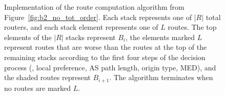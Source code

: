 



\begin{figure}[t]
\centering
\begin{psfrags}
\end{psfrags}
\caption[Implementation of the route computation algorithm from
  Figure~\ref{fig:b2_no_tot_order}.]{Implementation of the route
  computation algorithm from Figure~\ref{fig:b2_no_tot_order}.  Each
  stack represents one of $|R|$ total routers, and each stack element
  represents one of $L$ routes.  The top elements of the $|R|$ stacks
  represent $B_i$, the elements marked $L$ represent routes that are
  worse than the routes at the top of the remaining stacks according
  to the first four steps of the decision process (\ie, local
  preference, AS path length, origin type, MED), and the shaded routes
  represent $B_{i+1}$.  The algorithm terminates when no routes are
  marked $L$.}
\label{fig:b2_stack}
\end{figure}


